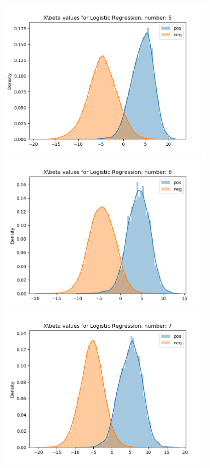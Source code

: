 \documentclass{article}
\begin{document}
\begin{figure}[H]
    \centering
    \begin{minipage}{0.19\textwidth}
        \centering
        \includegraphics[width=0.95\textwidth]{fig/lr/5_weighted.png}
    \end{minipage}
    \begin{minipage}{0.19\textwidth}
        \centering
        \includegraphics[width=0.95\textwidth]{fig/lr/6_weighted.png}
    \end{minipage}
    \begin{minipage}{0.19\textwidth}
        \centering
        \includegraphics[width=0.95\textwidth]{fig/lr/7_weighted.png}

\end{minipage}
\end{figure}
\end{document}

